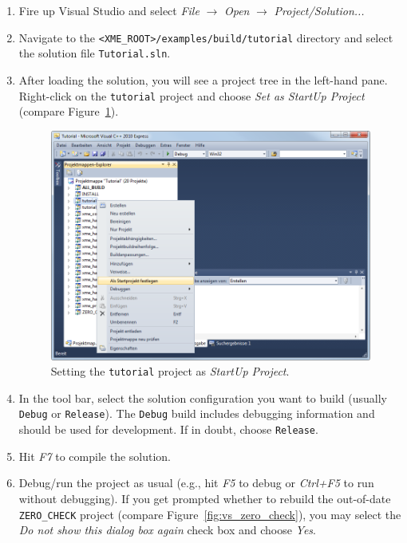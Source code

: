 \begin{enumerate}
	\item Fire up Visual Studio and select \emph{File} $\rightarrow$ \emph{Open} $\rightarrow$ \emph{Project/Solution...}
	\item Navigate to the \verb|<XME_ROOT>/examples/build/tutorial| directory and select the solution file \verb|Tutorial.sln|.
	\item After loading the solution, you will see a project tree in the left-hand pane.
		Right-click on the \verb|tutorial| project and choose \emph{Set as StartUp Project}
		(compare Figure~\ref{fig:vs_set_as_startup_project}).

\begin{figure}[htpb]
	\centering
	\includegraphics[scale=0.5]{figures/PNG/vs_set_as_startup_project.png}
	\caption{Setting the \texttt{tutorial} project as \emph{StartUp Project}.}
	\label{fig:vs_set_as_startup_project}
\end{figure}

	\item In the tool bar, select the solution configuration you want to build (usually \texttt{Debug} or \texttt{Release}).
		The \texttt{Debug} build includes debugging information and should be used for development.
		If in doubt, choose \texttt{Release}.

	\item Hit \emph{F7} to compile the solution.

	\item Debug/run the project as usual (e.g., hit \emph{F5} to debug or \emph{Ctrl+F5} to run without debugging).
		If you get prompted whether to rebuild the out-of-date \texttt{ZERO\_CHECK} project (compare Figure~\ref{fig:vs_zero_check}),
		you may select the \emph{Do not show this dialog box again} check box and choose \emph{Yes}.


\end{enumerate}
